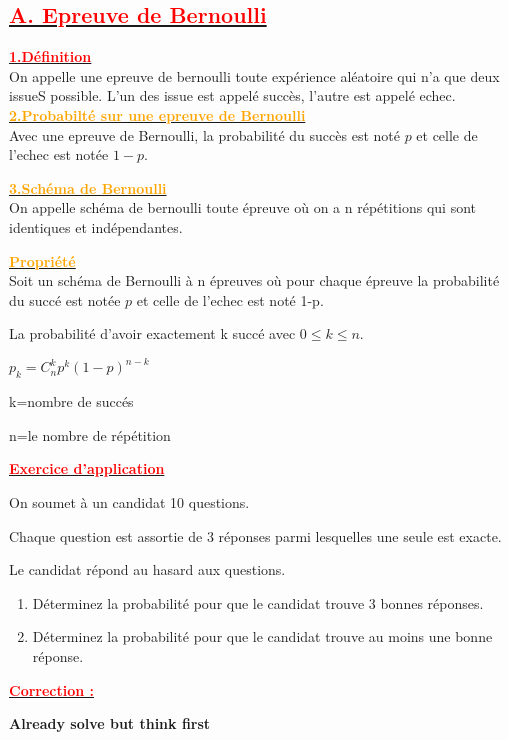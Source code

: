\documentclass[12pt]{article}
\begin{document}
\subsection*{\underline{\textbf{\textcolor{red}{A. Epreuve de Bernoulli}}}}
\underline{\textbf{\textcolor{red}{1.Définition}}}\\
On appelle une epreuve de bernoulli toute expérience aléatoire qui n'a que deux issueS possible. L'un des issue est appelé succès, l'autre est appelé echec.
\underline{\textbf{\textcolor{orange}{2.Probabilté sur une epreuve de Bernoulli}}}\\
Avec une epreuve de Bernoulli, la probabilité du succès est noté $p$ et celle de l'echec est notée $1-p$.

\underline{\textbf{\textcolor{orange}{3.Schéma de Bernoulli}}}\\
On appelle schéma de bernoulli toute épreuve où on a n répétitions qui sont identiques et indépendantes.

\underline{\textbf{\textcolor{orange}{Propriété}}}\\
Soit un schéma de Bernoulli à n épreuves où pour chaque épreuve la probabilité du succé est notée $p$ et celle de l'echec est noté 1-p. 

La probabilité d'avoir exactement k succé avec $0\leq k\leq n$.

$p_{k}=C^{k}_{n}p^{k}(1-p)^{n-k}$

k=nombre de succés

n=le nombre de répétition

\underline{\textbf{\textcolor{red}{Exercice d'application}}}

On soumet à un candidat 10 questions.

Chaque question est assortie de 3 réponses parmi lesquelles une seule est exacte.

Le candidat répond au hasard aux questions.

\begin{enumerate}
    \item Déterminez la probabilité pour que le candidat trouve 3 bonnes réponses.
    
    \item Déterminez la probabilité pour que le candidat trouve au moins une bonne réponse.
\end{enumerate}

\underline{\textbf{\textcolor{red}{Correction :}}}

\textbf{Already solve but think first}
\end{document}
